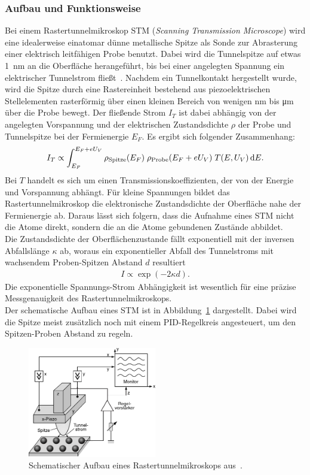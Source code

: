 \documentclass[a4paper,twoside,final]{article}
\begin{document}
\subsubsection{Aufbau und Funktionsweise}
Bei einem Rastertunnelmikroskop STM (\textit{Scanning Transmission Microscope}) wird eine idealerweise einatomar dünne metallische Spitze als Sonde zur Abrasterung einer elektrisch leitfähigen Probe benutzt. Dabei wird die Tunnelspitze auf etwas \SI{1}{\nano\metre} an die Oberfläche herangeführt, bis bei einer angelegten Spannung ein elektrischer Tunnelstrom fließt~\cite{Versuchsanleitung}. Nachdem ein Tunnelkontakt hergestellt wurde, wird die Spitze durch eine Rastereinheit bestehend aus piezoelektrischen Stellelementen rasterförmig über einen kleinen Bereich von wenigen \si{\nano\metre} bis \si{\micro\metre} über die Probe bewegt. Der fließende Strom $I_T$ ist dabei abhängig von der angelegten Vorspannung und der elektrischen Zustandsdichte $\rho$ der Probe und Tunnelspitze bei der Fermienergie $E_F$. Es ergibt sich folgender Zusammenhang:
\begin{align}
  I_T \propto \int_{E_F}^{E_F+ eU_V} \rho_\text{Spitze}(E_F)\;\rho_\text{Probe}(E_F+eU_V) \;T(E,U_V)\,\mathrm{d} E.
\end{align}
Bei $T$ handelt es sich um einen Transmissionskoeffizienten, der von der Energie und Vorspannung abhängt. Für kleine Spannungen bildet das Rastertunnelmikroskop die elektronische Zustandsdichte der Oberfläche nahe der Fermienergie ab. Daraus lässt sich folgern, dass die Aufnahme eines STM nicht die Atome direkt, sondern die an die Atome gebundenen Zustände abbildet.\\
Die Zustandsdichte der Oberflächenzustande fällt exponentiell mit der inversen Abfallslänge $\kappa$ ab, woraus ein exponentieller Abfall des Tunnelstroms mit wachsendem Proben-Spitzen Abstand $d$ resultiert
\begin{align}
  I \propto \exp(-2\kappa d).
\end{align}
Die exponentielle Spannungs-Strom Abhängigkeit ist wesentlich für eine präzise Messgenauigkeit des Rastertunnelmikroskops.\\
Der schematische Aufbau eines STM ist in Abbildung~\ref{fig:Rastertunnelmikroskop} dargestellt. Dabei wird die Spitze meist zusätzlich noch mit einem PID-Regelkreis angesteuert, um den Spitzen-Proben Abstand zu regeln.
\begin{figure}[htp]
    \centering
    \includegraphics[width=0.5\textwidth]{Bilder/Raster_Tunnelmikroskop.pdf}
    \caption{Schematischer Aufbau eines Rastertunnelmikroskops aus~\cite{Demtroeder}.}
    \label{fig:Rastertunnelmikroskop}
\end{figure}
\end{document}
